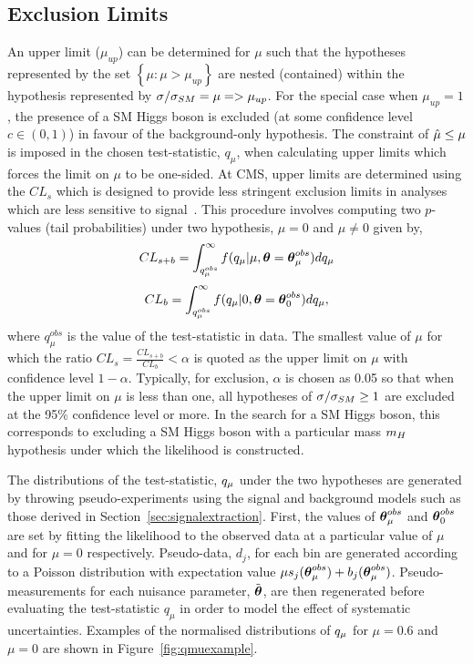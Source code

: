 \subsection{Exclusion Limits}
An upper limit ($\mu_{up}$) can be determined for $\mu$ such that
the hypotheses represented by the set $\left\{ \mu:\mu>\mu_{up} \right\}$
are nested (contained) within the hypothesis represented by $\sigma/\sigma_{SM}=\mu=>\mu_{up}$.
For the special case when $\mu_{up}=1$, the presence of a SM Higgs boson is excluded
(at some confidence level $c\in(0,1)$) in favour of the background-only hypothesis. 
The constraint of $\hat{\mu} \le \mu$ is imposed in the chosen test-statistic, $q_{\mu}$,  
when calculating upper limits which forces the limit on $\mu$ to be one-sided.
At CMS, upper limits are determined using the $CL_{s}$
which is designed to provide less stringent exclusion limits in analyses 
which are less sensitive to signal~\citep{cls}. 
This procedure involves computing two $p$-values (tail probabilities) under two hypothesis, $\mu=0$ and $\mu\ne0$ given by,
\begin{equation}
	CL_{s+b} = \int_{q_{\mu}^{obs}}^{\infty} f(q_{\mu} | \mu,{\boldsymbol{\theta}}={\boldsymbol{\theta}}_{\mu}^{obs}) dq_{\mu}
\label{eqn:clsplusb}
\end{equation}
\begin{equation}
	CL_{b} = \int_{q_{\mu}^{obs}}^{\infty} f(q_{\mu} |0,{\boldsymbol{\theta}}={\boldsymbol{\theta}}_{0}^{obs}) dq_{\mu},
\label{eqn:clb}
\end{equation}
where $q_{\mu}^{obs}$ is the value of the test-statistic in data. 
The smallest value of $\mu$ for which the ratio $CL_{s}=\frac{\displaystyle CL_{s+b}}{\displaystyle CL_{b}}<\alpha$ is quoted as the upper limit on $\mu$ with confidence level 
$1-\alpha$. Typically, for exclusion, $\alpha$ is chosen as 0.05 so that 
when the upper limit on $\mu$ is less than one, all hypotheses of $\sigma/\sigma_{SM}\ge1$ are excluded 
at the 95\% confidence level or more. In the search for a SM Higgs boson, this corresponds to excluding 
a SM Higgs boson with a particular mass $m_{H}$ hypothesis under which the likelihood is constructed.
 
The distributions of the test-statistic, $q_{\mu}$ under the two hypotheses are generated by 
throwing pseudo-experiments using the signal and background models such as those 
derived in Section~\ref{sec:signalextraction}.
First, the values of ${\boldsymbol{\theta}}^{obs}_{\mu}$ and ${\boldsymbol{\theta}}^{obs}_{0}$ are set by fitting the likelihood 
to the observed data at a particular value of $\mu$ and for $\mu=0$ respectively. Pseudo-data, $d_{j}$, for each bin
are generated according to a Poisson distribution with expectation value 
$\mu s_{j}({\boldsymbol{\theta}}_{\mu}^{obs})+b_{j}({\boldsymbol{\theta}}_{\mu}^{obs})$. Pseudo-measurements for each nuisance parameter,
$\tilde{{\boldsymbol{\theta}}}$, are then regenerated before evaluating the
test-statistic $q_{\mu}$ in order to model the effect of systematic uncertainties. 
Examples of the normalised distributions of $q_{\mu}$ for $\mu=0.6$ and $\mu=0$ are shown in 
Figure~\ref{fig:qmuexample}.

